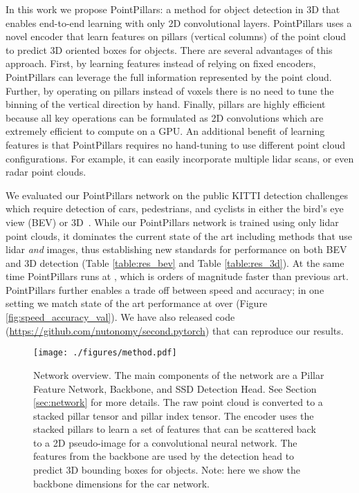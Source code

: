 \documentclass[10pt,twocolumn,letterpaper]{article}
\newcommand{\hertz}{\xspace} \newcommand{\maxhertz}{\xspace} \newcommand{\decorate}{9\xspace} \newcommand{\maxpillars}{12000\xspace} \newcommand{\maxpts}{100\xspace} \newcommand{\xyres}{0.16\xspace} \newcommand{\lidar}{lidar\xspace}
\newcommand{\figref}[1]{Figure \ref{#1}}
\newcommand{\tableref}[1]{Table \ref{#1}}
\newcommand{\squeeze}{\vspace{-0.5mm}}
\begin{document}
In this work we propose PointPillars: a method for object detection in 3D that enables end-to-end learning with only 2D convolutional layers.
PointPillars uses a novel encoder that learn features on pillars (vertical columns) of the point cloud to predict 3D oriented boxes for objects.
There are several advantages of this approach.
First, by learning features instead of relying on fixed encoders, PointPillars can leverage the full information represented by the point cloud.
Further, by operating on pillars instead of voxels there is no need to tune the binning of the vertical direction by hand.
Finally, pillars are highly efficient because all key operations can be formulated as 2D convolutions which are extremely  efficient to compute on a GPU.
An additional benefit of learning features is that PointPillars requires no hand-tuning to use different point cloud configurations.
For example, it can easily incorporate multiple lidar scans, or even radar point clouds.

We evaluated our PointPillars network on the public KITTI detection challenges which require detection of cars, pedestrians, and cyclists in either the bird's eye view (BEV) or 3D~\cite{kitti}.
While our PointPillars network is trained using only \lidar point clouds, it dominates the current state of the art including methods that use lidar \emph{and} images, thus establishing new standards for performance on both BEV and 3D detection (\tableref{table:res_bev} and \tableref{table:res_3d}). At the same time PointPillars runs at \hertz, which is orders of magnitude faster than previous art. PointPillars further enables a trade off between speed and accuracy; in one setting we match state of the art performance at over  (\figref{fig:speed_accuracy_val}). We have also released code (\href{https://github.com/nutonomy/second.pytorch}{https://github.com/nutonomy/second.pytorch}) that can reproduce our results.

\begin{figure*}
\begin{center}
\texttt{[image: ./figures/method.pdf]}
\end{center}
\squeeze
\caption{Network overview.
The main components of the network are a Pillar Feature Network, Backbone, and SSD Detection Head.
See Section \ref{sec:network} for more details.
The raw point cloud is converted to a stacked pillar tensor and pillar index tensor.
The encoder uses the stacked pillars to learn a set of features that can be scattered back to a 2D pseudo-image for a convolutional neural network.
The features from the backbone are used by the detection head to predict 3D bounding boxes for objects.
Note: here we show the backbone dimensions for the car network.}
\label{fig:network}
\label{fig:pointpillar}
\end{figure*}
\end{document}

